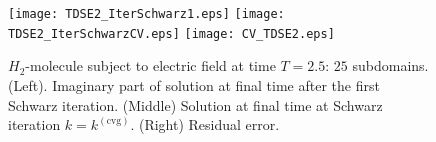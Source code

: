 %
\begin{figure}[!ht]
\begin{center}
\hspace*{1mm}\texttt{[image: TDSE2\_IterSchwarz1.eps]}
\hspace*{1mm}\texttt{[image: TDSE2\_IterSchwarzCV.eps]}
\hspace*{1mm}\texttt{[image: CV\_TDSE2.eps]}
\caption{$H_2$-molecule subject to electric field at time $T=2.5$: $25$ subdomains. (Left). Imaginary part of solution at final time after the first Schwarz iteration. (Middle) Solution at final time at Schwarz iteration $k=k^{(\textrm{cvg})}$. (Right) Residual error.}
\label{CVTDSE2}
\end{center}
\end{figure}
